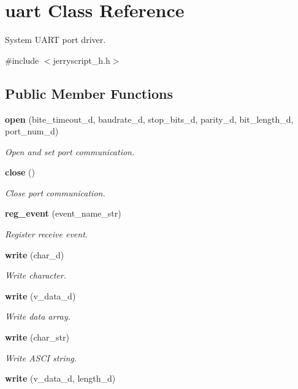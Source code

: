 \section{uart Class Reference}
\label{classuart}


System U\+A\+RT port driver.  




{\ttfamily \#include $<$jerryscript\+\_\+h.\+h$>$}

\subsection*{Public Member Functions}
\begin{DoxyCompactItemize}
\item 
\textbf{ open} (bite\+\_\+timeout\+\_\+d, baudrate\+\_\+d, stop\+\_\+bits\+\_\+d, parity\+\_\+d, bit\+\_\+length\+\_\+d, port\+\_\+num\+\_\+d)
\begin{DoxyCompactList}\small\item\em Open and set port communication. \end{DoxyCompactList}\item 
\textbf{ close} ()
\begin{DoxyCompactList}\small\item\em Close port communication. \end{DoxyCompactList}\item 
\textbf{ reg\+\_\+event} (event\+\_\+name\+\_\+str)
\begin{DoxyCompactList}\small\item\em Register receive event. \end{DoxyCompactList}\item 
\textbf{ write} (char\+\_\+d)
\begin{DoxyCompactList}\small\item\em Write character. \end{DoxyCompactList}\item 
\textbf{ write} (v\+\_\+data\+\_\+d)
\begin{DoxyCompactList}\small\item\em Write data array. \end{DoxyCompactList}\item 
\textbf{ write} (char\+\_\+str)
\begin{DoxyCompactList}\small\item\em Write A\+S\+CI string. \end{DoxyCompactList}\item 
\textbf{ write} (v\+\_\+data\+\_\+d, length\+\_\+d)

\end{DoxyCompactItemize}
